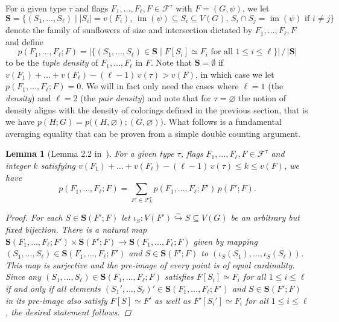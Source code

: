 \documentclass[a4paper,11pt]{article}
\newtheorem{lemma}[theorem]{Lemma}
\numberwithin{equation}{section}
\newcommand{\mF}{\mathcal{F}}
\begin{document}
For a given type $\tau$ and flags $F_1, \ldots, F_\ell, F \in \mF^\tau$ with $F = (G, \psi)$, we let
%
\begin{equation*}
    \mathbf{S}  = \{ (S_1, \ldots, S_\ell) \mid |S_i| = v(F_i), \, \operatorname{im}(\psi)  \subseteq S_i \subseteq V(G), \, S_i \cap S_j = \operatorname{im}(\psi) \text{ if } i \neq j \} %
\end{equation*}
%
denote the family of sunflowers of size and intersection dictated by $F_1, \ldots, F_\ell, F$ and define
%
\begin{equation*}
    p(F_1, \ldots, F_\ell; F) = | \{ (S_1, \ldots, S_\ell) \in \mathbf{S} \mid F[S_i] \simeq F_i \text{ for all } 1 \leq i \leq \ell \} | \, / \, |\mathbf{S}|
\end{equation*}
%
to be the \emph{tuple density} of $F_1, \ldots, F_\ell$ in $F$. Note that $\mathbf{S} = \emptyset$ if $v(F_1) + \ldots + v(F_\ell) - (\ell-1) \, v(\tau) > v(F)$, in which case we let $p(F_1, \ldots, F_\ell; F) = 0$. We will in fact only need the cases where $\ell = 1$ (the \emph{density}) and $\ell = 2$ (the \emph{pair density}) and note that for $\tau = \varnothing$ the notion of density aligns with the density of colorings defined in the previous section, that is we have $p(H; G) = p\big((H, \varnothing); (G, \varnothing) \big)$. What follows is a fundamental averaging equality that can be proven from a simple double counting argument.

\begin{lemma}[Lemma 2.2 in~\cite{Razborov_2007}] \label{lemma:double_counting}
    For a given type $\tau$, flags $F_1, \ldots, F_\ell, F \in \mF^\tau$ and integer $k$ satisfying $v(F_1) + \ldots + v(F_\ell) - (\ell-1) \, v(\tau) \leq k \leq v(F)$, we have
    \begin{equation*}
        p(F_1, \ldots, F_\ell; F) = \sum_{F' \in \mF^{\tau}_k} p(F_1, \ldots, F_\ell; F') \, p(F'; F).
    \end{equation*}
    \begin{proof}
        For each $S \in\mathbf S(F'; F)$ let $\iota_S: V(F') \overset{\sim}{\hookrightarrow} S \subseteq V(G)$ be an arbitrary but fixed bijection.
        There is a natural map $\mathbf{S}(F_1,\dots,F_\ell; F') \times \mathbf{S}(F'; F) \to \mathbf{S}(F_1,\dots,F_\ell;F)$ given by mapping $(S_1,\dots,S_\ell)\in \mathbf S(F_1,\dots,F_\ell;F')$ and $S \in \mathbf{S}(F'; F)$ to $(\iota_S(S_1),\dots,\iota_S(S_\ell))$. This map is surjective and the pre-image of every point is of equal cardinality.
        Since any $(S_1,\dots, S_\ell)\in\mathbf S(F_1,\dots,F_\ell;F)$ satisfies $F[S_i]\simeq F_i$  for all $1\le i\le \ell$ if and only if all elements $(S_1',\dots,S_\ell)'\in \mathbf S(F_1,\dots,F_\ell;F')$ and $S \in \mathbf{S}(F'; F)$ in its pre-image also satisfy $F[S] \simeq F'$ as well as $F'[S_i']\simeq F_i$ for all $1\le i\le \ell$,  the desired statement follows.
    \end{proof}
\end{lemma}
%
\end{document}
